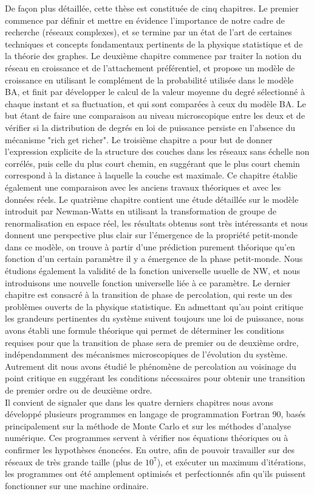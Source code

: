De façon plus détaillée, cette thèse est constituée de cinq chapitres. Le premier commence par définir et mettre en évidence l'importance de notre cadre de recherche (réseaux complexes), et se termine par un état de l'art de  certaines techniques et concepts fondamentaux pertinents de la physique statistique et de la théorie des graphes. Le deuxième chapitre commence par traiter la notion du réseau en croissance et de l'attachement préférentiel, et propose un  modèle de croissance en utilisant le complément de la probabilité utilisée dans le modèle BA, et finit par développer le calcul de la valeur moyenne du degré sélectionné à chaque instant et sa fluctuation, et qui sont comparées à ceux du modèle BA. Le but étant de faire une comparaison au niveau microscopique entre les deux et de vérifier si la distribution de degrés en loi de puissance persiste en l'absence du mécanisme "rich get richer". Le troisième chapitre a pour but de donner l'expression explicite de la structure des couches dans les réseaux sans échelle non corrélés, puis celle du plus court chemin, en suggérant que le plus court chemin correspond à la distance à laquelle la couche est maximale. Ce chapitre établie également une comparaison avec les anciens travaux théoriques et avec les données réels. Le quatrième chapitre contient une étude détaillée sur le modèle introduit par Newman-Watts en utilisant la transformation de groupe de renormalisation en espace réel, les résultats obtenus sont très intéressants et nous donnent une  perspective plus clair sur l'émergence de la propriété petit-monde dans ce modèle, on trouve à partir d'une prédiction purement théorique qu'en fonction d'un certain paramètre il y a émergence de la phase petit-monde. Nous étudions également la validité  de la fonction universelle usuelle de NW,  et nous introduisons une nouvelle fonction universelle liée à ce paramètre. Le dernier chapitre est consacré à la transition de phase  de percolation,  qui reste un des problèmes ouverts de la physique statistique. En admettant qu'au point critique les grandeurs pertinentes du système suivent toujours une loi de puissance, nous avons établi une formule théorique qui permet de déterminer les conditions requises pour que la transition de phase sera de premier ou de deuxième ordre, indépendamment des mécanismes microscopiques de l'évolution du système. Autrement dit nous avons étudié le phénomène de percolation au voisinage du point critique en suggérant les conditions nécessaires pour obtenir une transition de premier ordre ou de deuxième ordre.\\


Il convient de signaler que dans les quatre derniers chapitres nous avons développé plusieurs programmes en langage de programmation Fortran 90, basés principalement sur la méthode de Monte Carlo et sur les méthodes d'analyse numérique. Ces programmes servent à vérifier nos équations théoriques ou à confirmer les hypothèses énoncées. En outre, afin de pouvoir travailler sur des réseaux de très grande taille (plus de $10^7$), et exécuter un maximum d'itérations, les programmes ont été amplement optimisés et perfectionnés afin qu'ils puissent fonctionner sur une machine ordinaire. 


 
